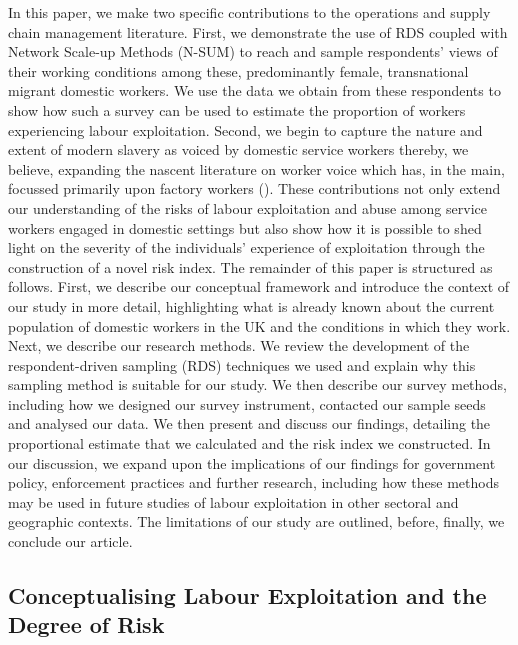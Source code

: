 \documentclass[
  12pt,
  letterpaper,
  DIV=11,
  numbers=noendperiod]{scrartcl}
\theoremstyle{plain}
\theoremstyle{definition}
\begin{document}
In this paper, we make two specific contributions to the operations and
supply chain management literature. First, we demonstrate the use of RDS
coupled with Network Scale-up Methods (N-SUM) to reach and sample
respondents' views of their working conditions among these,
predominantly female, transnational migrant domestic workers. We use the
data we obtain from these respondents to show how such a survey can be
used to estimate the proportion of workers experiencing labour
exploitation. Second, we begin to capture the nature and extent of
modern slavery as voiced by domestic service workers thereby, we
believe, expanding the nascent literature on worker voice which has, in
the main, focussed primarily upon factory workers
(\textcite{stephens_theorising_2024}). These contributions not only
extend our understanding of the risks of labour exploitation and abuse
among service workers engaged in domestic settings but also show how it
is possible to shed light on the severity of the individuals' experience
of exploitation through the construction of a novel risk index. The
remainder of this paper is structured as follows. First, we describe our
conceptual framework and introduce the context of our study in more
detail, highlighting what is already known about the current population
of domestic workers in the UK and the conditions in which they work.
Next, we describe our research methods. We review the development of the
respondent-driven sampling (RDS) techniques we used and explain why this
sampling method is suitable for our study. We then describe our survey
methods, including how we designed our survey instrument, contacted our
sample seeds and analysed our data. We then present and discuss our
findings, detailing the proportional estimate that we calculated and the
risk index we constructed. In our discussion, we expand upon the
implications of our findings for government policy, enforcement
practices and further research, including how these methods may be used
in future studies of labour exploitation in other sectoral and
geographic contexts. The limitations of our study are outlined, before,
finally, we conclude our article.

\subsection{Conceptualising Labour Exploitation and the Degree of
Risk}\label{conceptualising-labour-exploitation-and-the-degree-of-risk}
\end{document}
